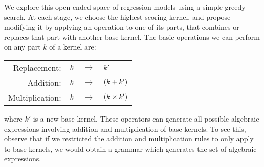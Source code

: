 We explore this open-ended space of regression models using a simple greedy search.
At each stage, we choose the highest scoring kernel, and propose modifying it by applying an operation to one of its parts, that combines or replaces that part with another base kernel.
The basic operations we can perform on any part $k$ of a kernel are:
%
\begin{center}
\begin{tabular}{rccl}
\textnormal{Replacement:}    & $k$ & $\to$ & $k'$\\
\textnormal{Addition:}       & $k$ & $\to$ & $(k + k')$\\
\textnormal{Multiplication:} & $k$ &  $\to$ & $(k \times k')$\\
\end{tabular}
\end{center}
%
where $k'$ is a new base kernel.
These operators can generate all possible algebraic expressions involving addition and multiplication of base kernels.
To see this, observe that if we restricted the addition and multiplication rules to only apply to base kernels, we would obtain a grammar which generates the set of algebraic expressions.

